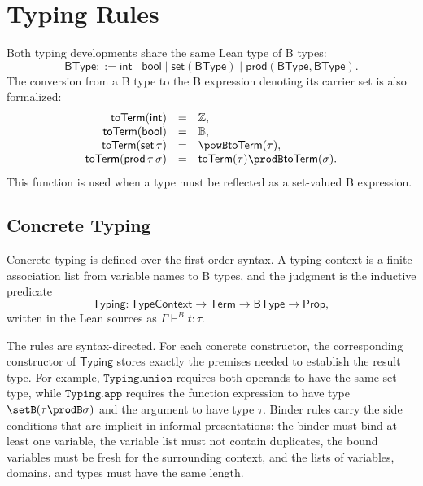 \section{Typing Rules}
\label{sec:b-typing-rules}
\label{sec:b-typing}

Both typing developments share the same Lean type of B types:
\[
  \mathsf{BType} ::= \mathsf{int}
  \mid \mathsf{bool}
  \mid \mathsf{set}(\mathsf{BType})
  \mid \mathsf{prod}(\mathsf{BType},\mathsf{BType}).
\]
The conversion from a B type to the B expression denoting its carrier set is
also formalized:
\[
\begin{array}{rcl}
\mathsf{toTerm}(\mathsf{int}) &=& \mathbb{Z},\\
\mathsf{toTerm}(\mathsf{bool}) &=& \mathbb{B},\\
\mathsf{toTerm}(\mathsf{set}\,\tau) &=& \powB\mathsf{toTerm}(\tau),\\
\mathsf{toTerm}(\mathsf{prod}\,\tau\,\sigma) &=&
  \mathsf{toTerm}(\tau) \prodB \mathsf{toTerm}(\sigma).
\end{array}
\]
This function is used when a type must be reflected as a set-valued B
expression.

\subsection{Concrete Typing}
\label{subsec:b-concrete-typing}

Concrete typing is defined over the first-order syntax.
A typing context is a finite association list from variable names to B types,
and the judgment is the inductive predicate
\[
  \mathsf{Typing} :
  \mathsf{TypeContext} \to \mathsf{Term} \to \mathsf{BType} \to \mathsf{Prop},
\]
written in the Lean sources as \(\Gamma \vdash^B t : \tau\).

The rules are syntax-directed.
For each concrete constructor, the corresponding constructor of
\(\mathsf{Typing}\) stores exactly the premises needed to establish the result
type.
For example, \(\texttt{Typing.union}\) requires both operands to have the same
set type, while \(\texttt{Typing.app}\) requires the function expression to
have type \(\setB(\tau \prodB \sigma)\) and the argument to have type \(\tau\).
Binder rules carry the side conditions that are implicit in informal
presentations: the binder must bind at least one variable, the variable list
must not contain duplicates, the bound variables must be fresh for the
surrounding context, and the lists of variables, domains, and types must have
the same length.

